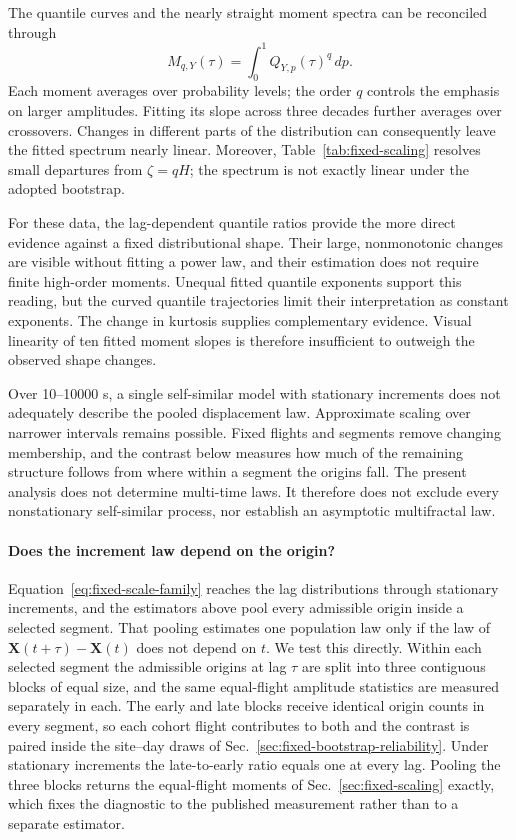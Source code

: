The quantile curves and the nearly straight moment spectra can be reconciled through
\begin{equation}
 M_{q,Y}(\tau)=\int_0^1 Q_{Y,p}(\tau)^q\,dp.
 \label{eq:fixed-moment-quantile}
\end{equation}
Each moment averages over probability levels; the order $q$ controls the emphasis
on larger amplitudes. Fitting its slope
across three decades further averages over crossovers. Changes in different parts
of the distribution can consequently leave the fitted spectrum nearly linear.
Moreover, Table~\ref{tab:fixed-scaling} resolves small departures from $\zeta=qH$;
the spectrum is not exactly linear under the adopted bootstrap.

For these data, the lag-dependent quantile ratios provide the more direct evidence
against a fixed distributional shape. Their large, nonmonotonic changes are visible
without fitting a power law, and their estimation does not require finite high-order
moments. Unequal fitted quantile exponents support this reading, but the curved
quantile trajectories limit their interpretation as constant exponents. The change
in kurtosis supplies complementary evidence. Visual linearity of ten fitted moment
slopes is therefore insufficient to outweigh the observed shape changes.

Over 10--10000 s, a single self-similar model with stationary increments does not
adequately describe the pooled displacement law.
Approximate scaling over narrower intervals remains possible. Fixed flights and
segments remove changing membership, and the contrast below measures how much of the
remaining structure follows from where within a segment the origins fall. The present
analysis does not determine multi-time laws. It therefore does not exclude every
nonstationary self-similar process, nor establish an asymptotic multifractal law.

\paragraph{Does the increment law depend on the origin?}
\label{sec:fixed-origin-dependence}

Equation~\eqref{eq:fixed-scale-family} reaches the lag distributions through
stationary increments, and the estimators above pool every admissible origin inside
a selected segment. That pooling estimates one population law only if the law of
$\boldsymbol X(t+\tau)-\boldsymbol X(t)$ does not depend on $t$. We test this
directly. Within each selected segment the admissible origins at lag $\tau$ are
split into three contiguous blocks of equal size, and the same equal-flight
amplitude statistics are measured separately in each. The early and late blocks
receive identical origin counts in every segment, so each cohort flight contributes
to both and the contrast is paired inside the site--day draws of
Sec.~\ref{sec:fixed-bootstrap-reliability}. Under stationary increments the
late-to-early ratio equals one at every lag. Pooling the three blocks returns the
equal-flight moments of Sec.~\ref{sec:fixed-scaling} exactly, which fixes the
diagnostic to the published measurement rather than to a separate estimator.

